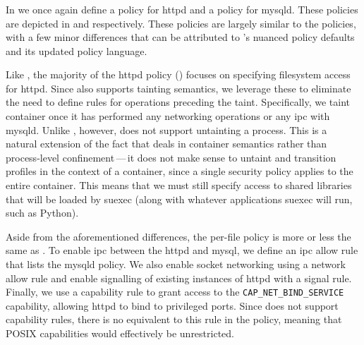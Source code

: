 \subsubsection{\bpfcontain{}}

In \bpfcontain{} we once again define a policy for httpd and a policy for mysqld.  These
policies are depicted in  and 
respectively. These policies are largely similar to the \bpfbox{} policies, with a few
minor differences that can be attributed to \bpfcontain{}'s nuanced policy defaults and
its updated policy language.

Like \bpfbox{}, the majority of the \bpfcontain{} httpd policy
() focuses on specifying filesystem access for httpd. Since
\bpfcontain{} also supports tainting semantics, we leverage these to eliminate the need to
define rules for operations preceding the taint. Specifically, we taint container once it
has performed any networking operations or any \gls{ipc} with mysqld. Unlike \bpfbox{},
however, \bpfcontain{} does not support untainting a process. This is a natural extension
of the fact that \bpfcontain{} deals in container semantics rather than process-level
confinement\,---\,it does not make sense to untaint and transition profiles in the context
of a container, since a single security policy applies to the entire container. This
means that we must still specify access to shared libraries that will be loaded by suexec
(along with whatever applications suexec will run, such as Python).

Aside from the aforementioned differences, the per-file policy is more or less the same as
\bpfbox{}. To enable \gls{ipc} between the httpd and mysql, we define an \gls{ipc} allow
rule that lists the mysqld policy. We also enable socket networking using a network allow
rule and enable signalling of existing instances of httpd with a signal rule. Finally, we
use a capability rule to grant access to the \texttt{CAP\_NET\_BIND\_SERVICE} capability,
allowing httpd to bind to privileged ports. Since \bpfbox{} does not support capability
rules, there is no equivalent to this rule in the \bpfbox{} policy, meaning that POSIX
capabilities would effectively be unrestricted.

